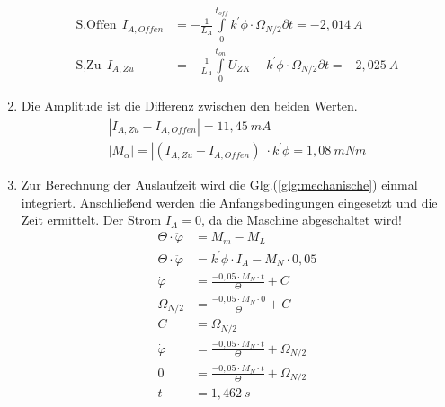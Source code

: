 \begin{solution}
\begin{enumerate}
\begin{align}
\text{S,Offen} ~~ I_{A,Offen} &= -\frac{1}{L_A} \int \limits_{0}^{t_{off}} k^{'} \phi \cdot \Omega_{N/2} \partial t=-2,014~A\\
\text{S,Zu}~~ I_{A,Zu}&=- \frac{1}{L_A}\int \limits_{0}^{t_{on}} U_{ZK} -k^{'} \phi \cdot \Omega_{N/2} \partial t=-2,025~A
\end{align}
\item Die Amplitude ist die Differenz zwischen den beiden Werten.
\begin{align}
|I_{A,Zu}- I_{A,Offen}|=11,45~mA\\
|M_\alpha| = |(I_{A,Zu}- I_{A,Offen})| \cdot k^{'} \phi = 1,08~mNm
\end{align}
\item Zur Berechnung der Auslaufzeit wird die Glg.(\ref{glg:mechanische}) einmal integriert. Anschließend werden die Anfangsbedingungen eingesetzt und die Zeit ermittelt. Der Strom $I_A =0$, da die Maschine abgeschaltet wird!
\begin{align}
\Theta \cdot \ddot{\varphi} &= M_m - M_L\\
\Theta \cdot \ddot{\varphi} &= k^{'} \phi \cdot I_A - M_N \cdot 0,05\\
\dot{\varphi} &= \frac{-0,05 \cdot M_N \cdot t}{\Theta}+ C\\
\Omega_{N/2} &= \frac{-0,05 \cdot M_N \cdot 0}{\Theta}+ C\\
C&= \Omega_{N/2}\\
\dot{\varphi} &= \frac{-0,05 \cdot M_N \cdot t}{\Theta}+ \Omega_{N/2}\\
0 &= \frac{-0,05 \cdot M_N \cdot t}{\Theta}+ \Omega_{N/2}\\
t &= 1,462~s
\end{align}
\end{enumerate}
\end{solution}
